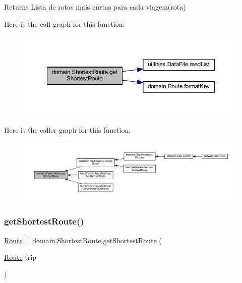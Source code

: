 \begin{DoxyReturn}{Returns}
Lista de rotas mais curtas para cada viagem(rota) 
\end{DoxyReturn}
Here is the call graph for this function\+:\nopagebreak
\begin{figure}[H]
\begin{center}
\leavevmode
\includegraphics[width=350pt]{classdomain_1_1_shortest_route_a7ae44089b0d36ae422c678294425ed3f_cgraph}
\end{center}
\end{figure}
Here is the caller graph for this function\+:\nopagebreak
\begin{figure}[H]
\begin{center}
\leavevmode
\includegraphics[width=350pt]{classdomain_1_1_shortest_route_a7ae44089b0d36ae422c678294425ed3f_icgraph}
\end{center}
\end{figure}
\mbox{\label{classdomain_1_1_shortest_route_a6378b797c933b6ebb2a48447761e02f7}} 
\subsubsection{\texorpdfstring{get\+Shortest\+Route()}{getShortestRoute()}\hspace{0.1cm}{\footnotesize\ttfamily [2/2]}}
{\footnotesize\ttfamily \hyperlink{classdomain_1_1_route}{Route} \mbox{[}$\,$\mbox{]} domain.\+Shortest\+Route.\+get\+Shortest\+Route (\begin{DoxyParamCaption}\item[{\hyperlink{classdomain_1_1_route}{Route}}]{trip }\end{DoxyParamCaption})}

